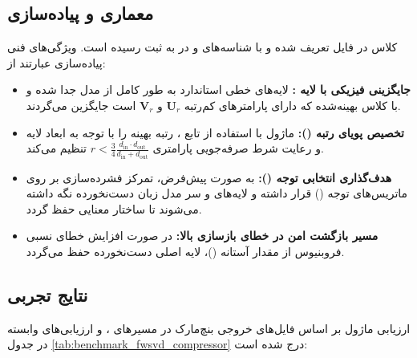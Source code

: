 \subsection{معماری و پیاده‌سازی}
کلاس  در فایل  تعریف شده و با شناسه‌های  و  در  به ثبت رسیده است. ویژگی‌های فنی پیاده‌سازی عبارتند از:
\begin{itemize}
    \item \textbf{جایگزینی فیزیکی با لایه :} لایه‌های خطی استاندارد به طور کامل از مدل جدا شده و با کلاس بهینه‌شده  که دارای پارامترهای کم‌رتبه $\mathbf{U}_r$ و $\mathbf{V}_r$ است جایگزین می‌گردند.
    \item \textbf{تخصیص پویای رتبه ():} ماژول با استفاده از تابع ، رتبه بهینه را با توجه به ابعاد لایه و رعایت شرط صرفه‌جویی پارامتری $r < \frac{3}{4} \frac{d_{\text{in}} \cdot d_{\text{out}}}{d_{\text{in}} + d_{\text{out}}}$ تنظیم می‌کند.
    \item \textbf{هدف‌گذاری انتخابی توجه ():} به صورت پیش‌فرض، تمرکز فشرده‌سازی بر روی ماتریس‌های توجه () قرار داشته و لایه‌های  و سر مدل زبان دست‌نخورده نگه داشته می‌شوند تا ساختار معنایی حفظ گردد.
    \item \textbf{مسیر بازگشت امن در خطای بازسازی بالا:} در صورت افزایش خطای نسبی فروبنیوس از مقدار آستانه ()، لایه اصلی دست‌نخورده حفظ می‌گردد.
\end{itemize}

\subsection{نتایج تجربی}
ارزیابی ماژول  بر اساس فایل‌های خروجی بنچ‌مارک در مسیرهای ،  و ارزیابی‌های وابسته در جدول \ref{tab:benchmark_fwsvd_compressor} درج شده است:

